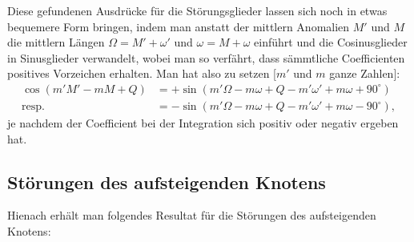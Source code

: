 \documentclass[10pt,a4paper]{article}
\begin{document}
Diese gefundenen Ausdrücke für die Störungsglieder lassen sich noch in etwas bequemere Form bringen, 
indem man anstatt der mittlern Anomalien $M'$ und $M$ die mittlern Längen 
$\Omega = M' + \omega'$ und $\omega = M + \omega$ 
einführt und die Cosinusglieder in Sinusglieder verwandelt, wobei man so verfährt, dass sämmtliche Coefficienten 
positives Vorzeichen erhalten. Man hat also zu setzen [$m'$ und $m$ ganze Zahlen]:
\begin{align*}
\cos(m'M' - mM + Q) &= +\sin(m'\Omega - m\omega + Q - m'\omega' + m\omega + 90^{\circ}) \\
\text{resp.} &= -\sin(m'\Omega - m\omega + Q - m'\omega' + m\omega - 90^{\circ}),
\end{align*}
je nachdem der Coefficient bei der Integration sich positiv oder negativ ergeben hat.

\newpage
\subsection*{Störungen des aufsteigenden Knotens}

Hienach erhält man folgendes Resultat für die Störungen des aufsteigenden Knotens:
\end{document}
